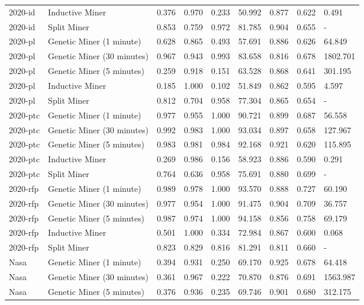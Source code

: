 \begin{tabular}{llrrrrrrl}
2020-id & Inductive Miner & 0.376 & 0.970 & 0.233 & 50.992 & 0.877 & 0.622 & 0.491 \\
2020-id & Split Miner & 0.853 & 0.759 & 0.972 & 81.785 & 0.904 & 0.655 & - \\
2020-pl & Genetic Miner (1 minute) & 0.628 & 0.865 & 0.493 & 57.691 & 0.886 & 0.626 & 64.849 \\
2020-pl & Genetic Miner (30 minutes) & 0.967 & 0.943 & 0.993 & 83.658 & 0.816 & 0.678 & 1802.701 \\
2020-pl & Genetic Miner (5 minutes) & 0.259 & 0.918 & 0.151 & 63.528 & 0.868 & 0.641 & 301.195 \\
2020-pl & Inductive Miner & 0.185 & 1.000 & 0.102 & 51.849 & 0.862 & 0.595 & 4.597 \\
2020-pl & Split Miner & 0.812 & 0.704 & 0.958 & 77.304 & 0.865 & 0.654 & - \\
2020-ptc & Genetic Miner (1 minute) & 0.977 & 0.955 & 1.000 & 90.721 & 0.899 & 0.687 & 56.558 \\
2020-ptc & Genetic Miner (30 minutes) & 0.992 & 0.983 & 1.000 & 93.034 & 0.897 & 0.658 & 127.967 \\
2020-ptc & Genetic Miner (5 minutes) & 0.983 & 0.981 & 0.984 & 92.168 & 0.921 & 0.620 & 115.895 \\
2020-ptc & Inductive Miner & 0.269 & 0.986 & 0.156 & 58.923 & 0.886 & 0.590 & 0.291 \\
2020-ptc & Split Miner & 0.764 & 0.636 & 0.958 & 75.691 & 0.880 & 0.699 & - \\
2020-rfp & Genetic Miner (1 minute) & 0.989 & 0.978 & 1.000 & 93.570 & 0.888 & 0.727 & 60.190 \\
2020-rfp & Genetic Miner (30 minutes) & 0.977 & 0.954 & 1.000 & 91.475 & 0.904 & 0.709 & 36.757 \\
2020-rfp & Genetic Miner (5 minutes) & 0.987 & 0.974 & 1.000 & 94.158 & 0.856 & 0.758 & 69.179 \\
2020-rfp & Inductive Miner & 0.501 & 1.000 & 0.334 & 72.984 & 0.867 & 0.600 & 0.068 \\
2020-rfp & Split Miner & 0.823 & 0.829 & 0.816 & 81.291 & 0.811 & 0.660 & - \\
Nasa & Genetic Miner (1 minute) & 0.394 & 0.931 & 0.250 & 69.170 & 0.925 & 0.678 & 64.418 \\
Nasa & Genetic Miner (30 minutes) & 0.361 & 0.967 & 0.222 & 70.870 & 0.876 & 0.691 & 1563.987 \\
Nasa & Genetic Miner (5 minutes) & 0.376 & 0.936 & 0.235 & 69.746 & 0.901 & 0.680 & 312.175 \\

\end{tabular}
